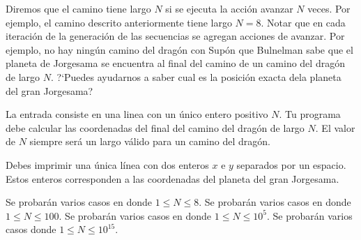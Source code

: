 \documentclass{oci}
\begin{document}
Diremos que el camino tiene largo $N$ si se ejecuta la acción avanzar $N$ veces.
Por ejemplo, el camino descrito anteriormente tiene largo $N = 8$.
Notar que en cada iteración de la generación de las secuencias se agregan acciones de avanzar.
Por ejemplo, no hay ningún camino del dragón con 
Supón que Bulnelman sabe que el planeta de Jorgesama se encuentra al final del camino de un camino del dragón de largo $N$.
?`Puedes ayudarnos a saber cual es la posición exacta dela planeta del gran Jorgesama?


\begin{inputDescription}
La entrada consiste en una linea con un único entero positivo $N$.
Tu programa debe calcular las coordenadas del final del camino del dragón de largo $N$.
El valor de $N$ siempre será un largo válido para un camino del dragón.
\end{inputDescription}

\begin{outputDescription}
Debes imprimir una única línea con dos enteros $x$ e $y$ separados por un espacio.
Estos enteros corresponden a las coordenadas del planeta del gran Jorgesama.
\end{outputDescription}

\begin{scoreDescription}
 Se probarán varios casos en donde $1 \leq N \leq 8$.
 Se probarán varios casos en donde $1 \leq N \leq 100$.
 Se probarán varios casos en donde $1 \leq N \leq 10^5$.
 Se probarán varios casos donde $1 \leq N \leq 10^{15}$. 
\end{scoreDescription}

\begin{sampleDescription}
\end{sampleDescription}
\end{document}
